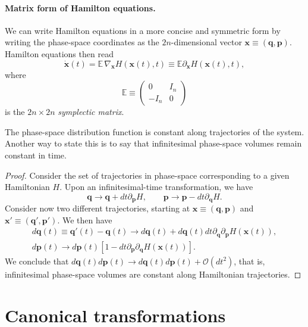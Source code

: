 \documentclass[12pt]{report}
\newcommand{\EE}{\mathbb{E}}
\newcommand{\bs}[1]{\boldsymbol{#1}}
\newcommand{\calO}{{\mathcal{O}}}
\begin{document}
\paragraph{Matrix form of Hamilton equations.}
We can write Hamilton equations in a more concise and symmetric form by writing the phase-space coordinates as the $2n$-dimensional vector $\bs x\equiv (\bs q,\bs p)$. Hamilton equations then read
\begin{equation}
	\dot{\bs x}(t) = \EE \,\nabla_{\bs x}H(\bs x(t), t)
	\equiv \EE \partial_{\bs x}H(\bs x(t), t),
\end{equation}
where
\begin{equation}
	\EE \equiv \begin{pmatrix}
		0 & I_n \\ -I_n & 0
	\end{pmatrix}
\end{equation}
is the $2n\times 2n$ \emph{symplectic matrix}.

\begin{prop}
	The phase-space distribution function is constant along trajectories of the system.
	Another way to state this is to say that infinitesimal phase-space volumes remain constant in time.
\end{prop}
\begin{proof}
	Consider the set of trajectories in phase-space corresponding to a given Hamiltonian $H$. Upon an infinitesimal-time transformation, we have
	\begin{equation}
		\bs q \to \bs q + dt \partial_{\bs p}H,
		\qquad
		\bs p \to \bs p - dt \partial_{\bs q}H.
	\end{equation}
	Consider now two different trajectories, starting at $\bs x\equiv(\bs q,\bs p)$ and $\bs x'\equiv(\bs q',\bs p')$.
	We then have
	\begin{equation}
	\begin{gathered}
		d\bs q(t) \equiv \bs q'(t) - \bs q(t)
		\to d\bs q(t) + d\bs q(t)dt\partial_{\bs q}\partial_{\bs p}H(\bs x(t)), \\
		d\bs p(t) \to d\bs p(t)[1 - dt \partial_{\bs p}\partial_{\bs q}H(\bs x(t))].
	\end{gathered}
	\end{equation}
	We conclude that $d\bs q(t)d\bs p(t) \to d\bs q(t)d\bs p(t) + \calO(dt^2)$, that is, infinitesimal phase-space volumes are constant along Hamiltonian trajectories.
\end{proof}

\section{Canonical transformations}
\end{document}
